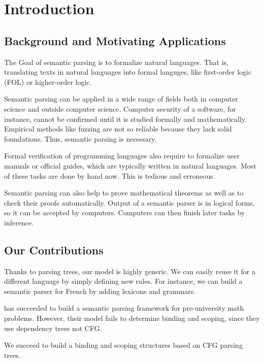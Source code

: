 \documentclass{article}
\begin{document}
\section{Introduction}{
	\subsection{Background and Motivating Applications}{
		The Goal of semantic parsing is to formalize natural languages. That is, translating texts in natural languages into formal languges, like first-order logic (FOL) or higher-order logic. 





		Semantic parsing can be applied in a wide range of fields both in computer science and outside computer science. Computer security of a software, for instance, cannot be confirmed until it is studied formally and mathematically. Empirical methods like fuzzing are not so reliable because they lack solid foundations. Thus, semantic parsing is necessary. 

		Formal verification of programming languages also require to formalize user manuals or official guides, which are typically written in natural languages. Most of these tasks are done by hand now. This is tedious and erroneous. 

		Semantic parsing can also help to prove mathematical theorems as well as to check their proofs automatically. Output of a semantic parser is in logical forms, so it can be accepted by computers. Computers can then finish later tasks by inference. 
	}

	\subsection{Our Contributions}{
		Thanks to parsing trees, our model is highly generic. We can easily reuse it for a different language by simply defining new rules. For instance, we can build a semantic parser for French by adding lexicons and grammars.  

		\cite{matsuzaki} has succeeded to build a semantic parsing framework for pre-university math problems. However, their model fails to determine binding and scoping, since they use dependency trees not CFG. 

		We succeed to build a binding and scoping structures based on CFG parsing trees. 
	}
}
\end{document}

